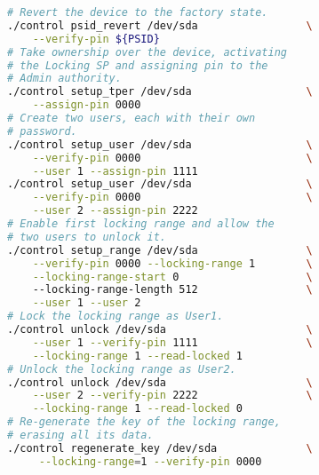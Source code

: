 



\begin{lstlisting}[language=bash,caption=Workflow with \texttt{control} utility,label={lst:control_workflow},keywordstyle=\color{black}]
# Revert the device to the factory state.
./control psid_revert /dev/sda                 \
    --verify-pin ${PSID}
# Take ownership over the device, activating 
# the Locking SP and assigning pin to the 
# Admin authority.
./control setup_tper /dev/sda                  \
    --assign-pin 0000
# Create two users, each with their own
# password.
./control setup_user /dev/sda                  \
    --verify-pin 0000                          \
    --user 1 --assign-pin 1111
./control setup_user /dev/sda                  \
    --verify-pin 0000                          \
    --user 2 --assign-pin 2222
# Enable first locking range and allow the 
# two users to unlock it.
./control setup_range /dev/sda                 \
    --verify-pin 0000 --locking-range 1        \
    --locking-range-start 0                    \ 
    --locking-range-length 512                 \
    --user 1 --user 2
# Lock the locking range as User1.
./control unlock /dev/sda                      \
    --user 1 --verify-pin 1111                 \
    --locking-range 1 --read-locked 1
# Unlock the locking range as User2.
./control unlock /dev/sda                      \
    --user 2 --verify-pin 2222                 \
    --locking-range 1 --read-locked 0
# Re-generate the key of the locking range,
# erasing all its data.
./control regenerate_key /dev/sda              \
     --locking-range=1 --verify-pin 0000
\end{lstlisting}

